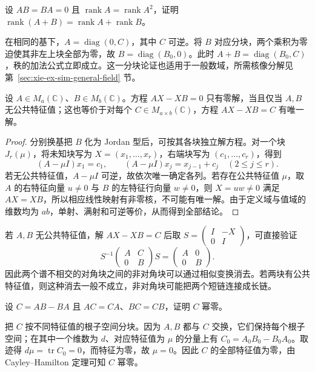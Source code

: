 \begin{example}
设 $AB=BA=0$ 且 $\operatorname{rank}A=\operatorname{rank}A^2$，证明 $\operatorname{rank}(A+B)=\operatorname{rank}A+\operatorname{rank}B$。
\end{example}
\begin{solve}
在相同的基下，$A=\operatorname{diag}(0,C)$，其中 $C$ 可逆。将 $B$ 对应分块，两个乘积为零迫使其非左上块全部为零，故 $B=\operatorname{diag}(B_0,0)$。此时 $A+B=\operatorname{diag}(B_0,C)$，秩的加法公式立即成立。这一分块论证也适用于一般数域，所需核像分解见第~\ref{sec:xie-ex-sim-general-field} 节。
\end{solve}

\begin{theorem}[Sylvester 方程]
\label{thm:xie-ex-sim-sylvester}
设 $A\in M_a(\mathbb C)$、$B\in M_b(\mathbb C)$。方程 $AX-XB=0$ 只有零解，当且仅当 $A,B$ 无公共特征值；这也等价于对每个 $C\in M_{a\times b}(\mathbb C)$，方程 $AX-XB=C$ 有唯一解。
\end{theorem}
\begin{proof}
分别换基把 $B$ 化为 Jordan 型后，可按其各块独立解方程。对一个块 $J_r(\mu)$，将未知块写为 $X=(x_1,\ldots,x_r)$，右端块写为 $(c_1,\ldots,c_r)$，得到
\[
 (A-\mu I)x_1=c_1,\qquad
 (A-\mu I)x_j=x_{j-1}+c_j\quad(2\leq j\leq r).
\]
若无公共特征值，$A-\mu I$ 可逆，故依次唯一确定各列。若存在公共特征值 $\mu$，取 $A$ 的右特征向量 $u\ne0$ 与 $B$ 的左特征行向量 $w\ne0$，则 $X=uw\ne0$ 满足 $AX=XB$，所以相应线性映射有非零核，不可能有唯一解。由于定义域与值域的维数均为 $ab$，单射、满射和可逆等价，从而得到全部结论。
\end{proof}

若 $A,B$ 无公共特征值，解 $AX-XB=C$ 后取 $S=\left(\begin{smallmatrix}I&-X\\0&I\end{smallmatrix}\right)$，可直接验证
\[
 S^{-1}\begin{pmatrix}A&C\\0&B\end{pmatrix}S
 =\begin{pmatrix}A&0\\0&B\end{pmatrix}.
\]
因此两个谱不相交的对角块之间的非对角块可以通过相似变换消去。若两块有公共特征值，则这种消去一般不成立，非对角块可能把两个短链连接成长链。

\begin{example}
设 $C=AB-BA$ 且 $AC=CA$、$BC=CB$，证明 $C$ 幂零。
\end{example}
\begin{solve}
把 $C$ 按不同特征值的根子空间分块。因为 $A,B$ 都与 $C$ 交换，它们保持每个根子空间；在其中一个维数为 $d$、对应特征值为 $\mu$ 的分量上有 $C_0=A_0B_0-B_0A_0$。取迹得 $d\mu=\operatorname{tr}C_0=0$，而特征为零，故 $\mu=0$。因此 $C$ 的全部特征值为零，由 Cayley--Hamilton 定理可知 $C$ 幂零。
\end{solve}

